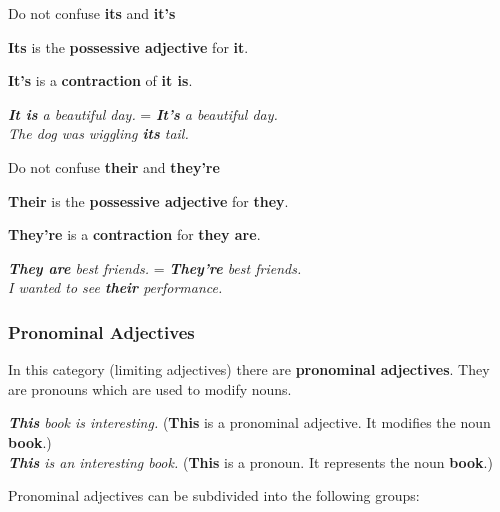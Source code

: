 \documentclass[hidelinks,10pt,a4paper]{article}
\begin{document}
Do not confuse \textbf{its} and \textbf{it's}

\textbf{Its} is the \textbf{possessive adjective} for \textbf{it}.

\textbf{It's} is a \textbf{contraction} of \textbf{it is}.

\begin{center}
	\textit{\textbf{It is} a beautiful day.} = \textit{\textbf{It's} a beautiful day.}\\
	\textit{The dog was wiggling \textbf{its} tail.}
\end{center}

Do not confuse \textbf{their} and \textbf{they're}

\textbf{Their} is the \textbf{possessive adjective} for \textbf{they}.

\textbf{They're} is a \textbf{contraction} for \textbf{they are}.

\begin{center}
	\textit{\textbf{They are} best friends.} = \textit{\textbf{They're} best friends.} \\
	\textit{I wanted to see \textbf{their} performance.}
\end{center}

\subsubsection{Pronominal Adjectives}
In this category (limiting adjectives) there are \textbf{pronominal adjectives}. They are pronouns which are used to modify nouns.

\begin{center}
	\textit{\textbf{This} book is interesting.} (\textbf{This} is a pronominal adjective. It modifies the noun \textbf{book}.) \\
	\textit{\textbf{This} is an interesting book.} (\textbf{This} is a pronoun. It represents the noun \textbf{book}.)
\end{center}


Pronominal adjectives can be subdivided into the following groups:
\end{document}
